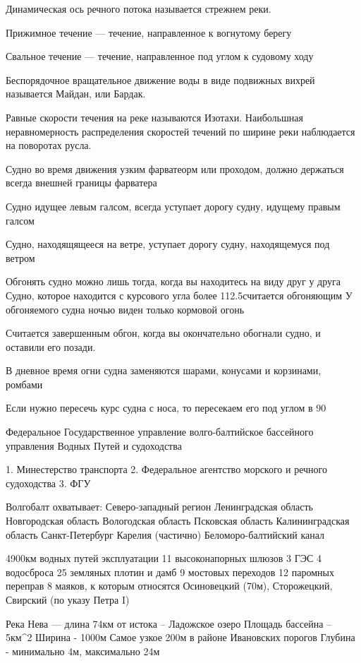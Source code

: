 \documentclass{article}        %
\begin{document}
Динамическая ось речного потока называется стрежнем реки.

Прижимное течение --- течение, направленное к вогнутому берегу

Свальное течение --- течение, направленное под углом к судовому ходу

Беспорядочное вращательное движение воды в виде подвижных вихрей называется Майдан, или Бардак.

Равные скорости течения на реке называются Изотахи. Наибольшная неравномерность распределения скоростей течений по ширине реки наблюдается на поворотах русла.

Судно во время движения узким фарватеорм или проходом, должно держаться всегда внешней границы фарватера

Судно идущее левым галсом, всегда уступает дорогу судну, идущему правым галсом

Судно, находящящееся на ветре, уступает дорогу судну, находящемуся под ветром

Обгонять судно можно лишь тогда, когда вы находитесь на виду друг у друга
Судно, которое находится с курсового угла более 112.5\degree считается обгоняющим
У обгоняемого судна ночью виден только кормовой огонь

Считается завершенным обгон, когда вы окончательно обогнали судно, и оставили его позади.

В дневное время огни судна заменяются шарами, конусами и корзинами, ромбами

Если нужно пересечь курс судна с носа, то пересекаем его под углом в 90\degree

Федеральное Государственное управление волго-балтийское бассейного 
управления Водных Путей и судоходства

1. Минестерство транспорта
2. Федеральное агентство морского и речного судоходства
3. ФГУ

Волгобалт охватывает:
	Северо-западный регион
	Ленинградская область
	Новгородская область
	Вологодская область
	Псковская область
	Калининградская область
	Санкт-Петербург
	Карелия (частично)
	Беломоро-балтийский канал

4900км водных путей эксплуатации
11 высоконапорных шлюзов
3 ГЭС
4 водосброса
25 земляных плотин и дамб
9 мостовых переходов
12 паромных переправ
8 маяков, к которым относятся Осиновецкий (70м), Сторожецкий, Свирский (по указу Петра I)


Река Нева --- длина 74км от истока -- Ладожское озеро
Площадь бассейна -- 5км^2
Ширина - 1000м
Самое узкое 200м в районе Ивановских порогов
Глубина - минимально 4м, максимально 24м
\end{document}
